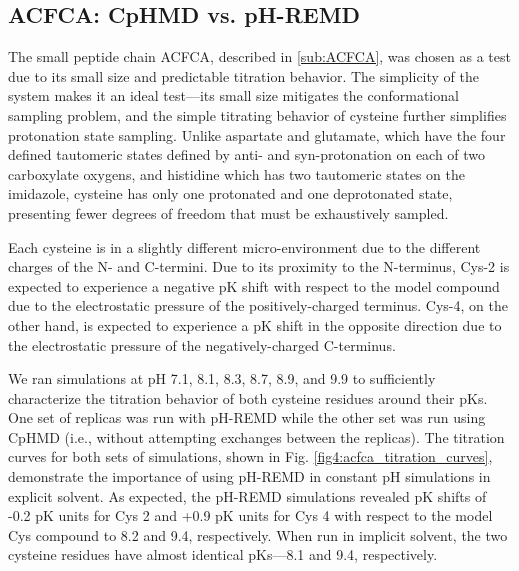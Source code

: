 \subsection{ACFCA: CpHMD vs. pH-REMD}

The small peptide chain ACFCA, described in \ref{sub:ACFCA}, was chosen as a
test due to its small size and predictable titration behavior. The simplicity of
the system makes it an ideal test---its small size mitigates the conformational
sampling problem, and the simple titrating behavior of cysteine further
simplifies protonation state sampling. Unlike aspartate and glutamate, which
have the four defined tautomeric states defined by anti- and syn-protonation on
each of two carboxylate oxygens, and histidine which has two tautomeric states
on the imidazole, cysteine has only one protonated and one deprotonated state,
presenting fewer degrees of freedom that must be exhaustively sampled.

Each cysteine is in a slightly different micro-environment due to the different
charges of the N- and C-termini. Due to its proximity to the N-terminus, Cys-2
is expected to experience a negative pK shift with respect to the model
compound due to the electrostatic pressure of the positively-charged terminus.
Cys-4, on the other hand, is expected to experience a pK shift in the
opposite direction due to the electrostatic pressure of the negatively-charged
C-terminus.

We ran simulations at pH 7.1, 8.1, 8.3, 8.7, 8.9, and 9.9 to sufficiently
characterize the titration behavior of both cysteine residues around their
pKs. One set of replicas was run with pH-REMD while the other set was run
using CpHMD (i.e., without attempting exchanges between the replicas). The
titration curves for both sets of simulations, shown in
Fig. \ref{fig4:acfca_titration_curves}, demonstrate the importance of using
pH-REMD in constant pH simulations in explicit solvent. As expected, the pH-REMD
simulations revealed pK shifts of -0.2 pK units for Cys 2 and +0.9 pK
units for Cys 4 with respect to the model Cys compound to 8.2 and 9.4,
respectively. When run in implicit solvent, the two cysteine residues have
almost identical pKs---8.1 and 9.4, respectively.

